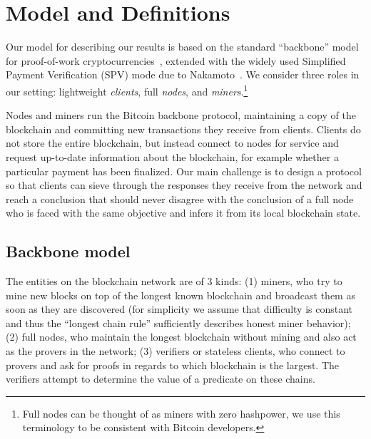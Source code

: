 \section{Model and Definitions}
\label{sec.model}
Our model for describing our results is based on the standard ``backbone'' model for proof-of-work cryptocurrencies~\cite{backbone}, extended with the widely used Simplified Payment Verification (SPV) mode due to Nakamoto~\cite{bitcoin}.
We consider three roles in our setting: lightweight \emph{clients},  full \emph{nodes}, and \emph{miners}.\footnote{Full nodes can be thought of as miners with zero hashpower, we use this terminology to be consistent with Bitcoin developers.}

Nodes and miners run the Bitcoin backbone protocol, maintaining a copy of the blockchain and committing new transactions they receive from clients.
Clients do not store the entire blockchain, but instead connect to nodes for service and request up-to-date information about the blockchain, for example whether a particular payment has been finalized. Our main challenge is to design a protocol so that clients can sieve through  the responses they receive from
the network and reach a conclusion that should never disagree with the conclusion of a full  node
who is faced
with the same objective and infers it from its local blockchain  state.

\subsection{Backbone model}


The entities on the blockchain network are of 3 kinds: (1) miners, who
try to mine new blocks on top of the longest known blockchain and broadcast them
as soon as they are discovered (for simplicity we assume that difficulty
is constant and thus the ``longest chain rule'' sufficiently describes honest miner behavior); (2) full nodes, who maintain the longest
blockchain without mining and also act as the provers in the network; (3)
verifiers or stateless clients, who connect to provers and ask for proofs in
regards to which blockchain is the largest. The verifiers attempt to determine
the value of a predicate on these chains.

